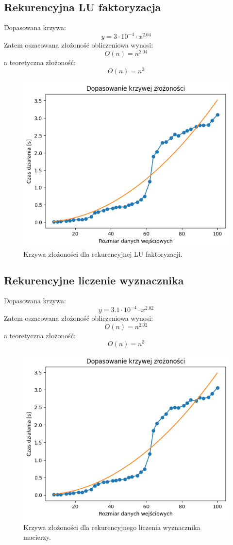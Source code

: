 \documentclass[11pt, leqno]{scrartcl}
\begin{document}
    \subsection{Rekurencyjna LU faktoryzacja}
    Dopasowana krzywa:
    \[
        y=3 \cdot 10^{-4} \cdot x^{2.04}
    \]
    Zatem oszacowana złożoność obliczeniowa wynosi:
    \[
        O(n)=n^{2.04}
    \]
    a teoretyczna złożoność:
    \[
        O(n)=n^3
    \]
    \begin{figure}[H]
        \centering
        \includegraphics[width=0.7\linewidth]{zlozonosc_lu.png}
        \caption{Krzywa złożoności dla rekurencyjnej LU faktoryzacji.}
    \end{figure}

    \subsection{Rekurencyjne liczenie wyznacznika}
    Dopasowana krzywa:
    \[
        y=3.1 \cdot 10^{-4} \cdot x^{2.02}
    \]
    Zatem oszacowana złożoność obliczeniowa wynosi:
    \[
        O(n)=n^{2.02}
    \]
    a teoretyczna złożoność:
    \[
        O(n)=n^3
    \]
    \begin{figure}[H]
        \centering
        \includegraphics[width=0.7\linewidth]{zlozonosc_det.png}
        \caption{Krzywa złożoności dla rekurencyjnego liczenia
            wyznacznika macierzy.}
    \end{figure}
\end{document}
